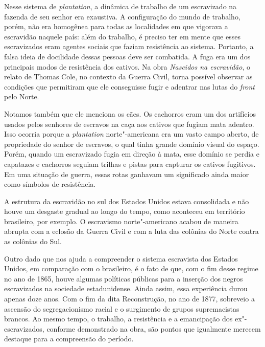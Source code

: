 \documentclass[11pt]{extarticle}
\begin{document}

Nesse sistema de \emph{plantation}, a dinâmica de trabalho de um
escravizado na fazenda de seu senhor era exaustiva. A configuração do
mundo de trabalho, porém, não era homogênea para todas as localidades em
que vigorava a escravidão naquele país: além do trabalho, é preciso ter
em mente que esses escravizados eram agentes sociais que faziam
resistência ao sistema. Portanto, a falsa ideia de docilidade dessas
pessoas deve ser combatida. A fuga era um dos principais modos de
resistência dos cativos. Na obra \emph{Nascidos na escravidão}, o relato
de Thomas Cole, no contexto da Guerra Civil, torna possível observar as
condições que permitiram que ele conseguisse fugir e adentrar nas lutas
do \emph{front} pelo Norte.

Notamos também que ele menciona os cães. Os cachorros eram um dos
artifícios usados pelos senhores de escravos na caça aos cativos que
fugiam mata adentro. Isso ocorria porque a \emph{plantation}
norte"-americana era um vasto campo aberto, de propriedade do senhor de
escravos, o qual tinha grande domínio visual do espaço. Porém, quando um
escravizado fugia em direção à mata, esse domínio se perdia e capatazes
e cachorros seguiam trilhas e pistas para capturar os cativos fugitivos.
Em uma situação de guerra, essas rotas ganhavam um significado ainda
maior como símbolos de resistência.

A estrutura da escravidão no sul dos Estados Unidos estava consolidada e
não houve um desgaste gradual ao longo do tempo, como aconteceu em
território brasileiro, por exemplo. O escravismo norte"-americano acabou
de maneira abrupta com a eclosão da Guerra Civil e com a luta das
colônias do Norte contra as colônias do Sul.

Outro dado que nos ajuda a compreender o sistema escravista dos Estados
Unidos, em comparação com o brasileiro, é o fato de que, com o fim desse
regime no ano de 1865, houve algumas políticas públicas para a inserção
dos negros escravizados na sociedade estadunidense. Ainda assim, essa
experiência durou apenas doze anos. Com o fim da dita Reconstrução, no
ano de 1877, sobreveio a ascensão do segregacionismo racial e o
surgimento de grupos supremacistas brancos. Ao mesmo tempo, o trabalho,
a resistência e a emancipação dos ex"-escravizados, conforme demonstrado
na obra, são pontos que igualmente merecem destaque para a compreensão
do período.
\end{document}
